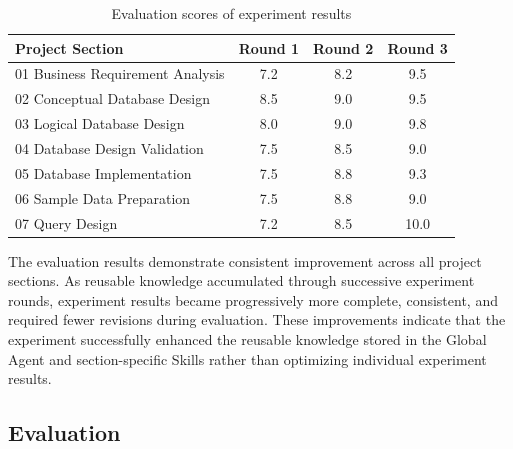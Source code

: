 \begin{table}[H]

\centering

\caption{Evaluation scores of experiment results}

\label{tab:progress}

\begin{tabularx}{\linewidth}{lccc}

\toprule

\textbf{Project Section}
&
\textbf{Round 1}
&
\textbf{Round 2}
&
\textbf{Round 3}

\\

\midrule

01 Business Requirement Analysis
&
7.2
&
8.2
&
9.5
\\

02 Conceptual Database Design
&
8.5
&
9.0
&
9.5
\\

03 Logical Database Design
&
8.0
&
9.0
&
9.8
\\

04 Database Design Validation
&
7.5
&
8.5
&
9.0
\\

05 Database Implementation
&
7.5
&
8.8
&
9.3
\\

06 Sample Data Preparation
&
7.5
&
8.8
&
9.0
\\

07 Query Design
&
7.2
&
8.5
&
10.0
\\

\bottomrule

\end{tabularx}

\end{table}

The evaluation results demonstrate consistent improvement across all project sections. As reusable knowledge accumulated through successive experiment rounds, experiment results became progressively more complete, consistent, and required fewer revisions during evaluation. These improvements indicate that the experiment successfully enhanced the reusable knowledge stored in the Global Agent and section-specific Skills rather than optimizing individual experiment results.

\subsection{Evaluation}


